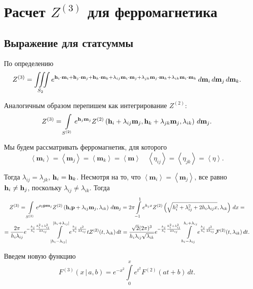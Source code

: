 \documentclass[12pt]{article}
\def\m{\mathbf m{}}
\def\p{\mathbf p{}}
\def\h{{\bf h}}
\def\sr#1{\left<#1\right>}
\def\ZV{Z^{(2)}}
\def\ZW{Z^{(3)}}
\def\FV{F^{(2)}}
\def\FW{F^{(3)}}
\def\cFV{{\cal F}^{(2)}}
\def\IIIS{\iiint\limits_{S_2}}
\def\SV{S^{(2)}}
\begin{document}
\section*{Расчет $\ZW$ для ферромагнетика}
\subsection*{Выражение для статсуммы}
По определению
\begin{equation}
    \ZW = \IIIS e^{\h_i\cdot\m_i + \h_j\cdot\m_j + \h_k\cdot\m_k + \lambda_{ij}\m_i\cdot\m_j + \lambda_{jk}\m_j\cdot\m_k + \lambda_{ik}\m_i\cdot\m_k} \,d\m_i\,d\m_j\,d\m_k.
\end{equation}

Аналогичным образом перепишем как интегрирование $\ZV$:
\begin{equation}
    \ZW = \int\limits_{\SV}e^{\h_j\m_j} \ZV\left(\h_i+\lambda_{ij}\m_j, \h_k+\lambda_{jk}\m_j, \lambda_{ik}\right)\,d\m_j.
\end{equation}

Мы будем рассматривать ферромагнетик, для которого
\begin{equation}
    \sr{\m_i} = \sr{\m_j} = \sr{\m_k} = \sr{\m} \quad \sr{\eta_{ij}} = \sr{\eta_{jk}} = \sr{\eta}.
\end{equation}

Тогда $\lambda_{ij} = \lambda_{jk}$, $\h_i = \h_k$. Несмотря на то, что  $\sr{\m_i} =  \sr{\m_j}$, все равно $\h_i \neq \h_j$, поскольку $\lambda_{ij} \neq \lambda_{ik}$. Тогда
\begin{multline}
    \ZW =  \int\limits_{\SV}e^{\rho_2\p\m_j}\ZV\left(\h_i \p+\lambda_{ij}\m_j, \lambda_{ik}\right)\,d\m_j = 2\pi \int\limits_{-1}^1 e^{h_jx}\ZV\left(\sqrt{h_i^2 + \lambda_{ij}^2 + 2h_i\lambda_{ij} x}, \lambda_{ik}\right)\,dx =\\= \frac{2\pi}{h_i\lambda_{ij}} e^{-\frac{h_j}{h_i}\frac{h_i^2+\lambda_{ij}^2}{2\lambda_{ij}}} \int\limits_{|h_i-\lambda_{ij}|}^{|h_i+\lambda_{ij}|} e^{\frac{h_j}{h_i}\frac{t^2}{2\lambda_{ij}}}t\ZV(t, \lambda_{ik})\,dt = \frac{\sqrt{2}(2\pi)^3}{h_i\lambda_{ij}\sqrt{\lambda_{ik}}} e^{-\frac{h_j}{h_i}\frac{h_i^2+\lambda_{ij}^2}{2\lambda_{ij}}} \int\limits_{h_i-\lambda_{ij}}^{h_i+\lambda_{ij}} e^{\frac{h_j}{h_i}\frac{t^2}{2\lambda_{ij}}}\cFV(t, \lambda_{ik})\,dt.
\end{multline}

Введем новую функцию
\begin{equation}
    \FW(x \, | \, a, b) = e^{-x^2}\int\limits_0^xe^{t^2} \FV(at+b) \,dt.
\end{equation}
\end{document}
